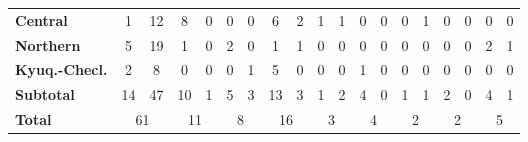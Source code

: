 \begin{table}[H]
{\begin{tabular}{lcccccccccccccccccc}
\multicolumn{1}{l|}{\textbf{Central}} & \multicolumn{1}{c|}{1} & \multicolumn{1}{c|}{12} & \multicolumn{1}{c|}{8} & \multicolumn{1}{c|}{0} & \multicolumn{1}{c|}{0} & \multicolumn{1}{c|}{0} & \multicolumn{1}{c|}{6} & \multicolumn{1}{c|}{2} & \multicolumn{1}{c|}{1} & \multicolumn{1}{c|}{1} & \multicolumn{1}{c|}{0} & \multicolumn{1}{c|}{0} & \multicolumn{1}{c|}{0} & \multicolumn{1}{c|}{1} & \multicolumn{1}{c|}{0} & \multicolumn{1}{c|}{0} & \multicolumn{1}{c|}{0} & \multicolumn{1}{c|}{0} \\ \cline{2-19} 
\multicolumn{1}{l|}{\textbf{Northern}} & \multicolumn{1}{c|}{5} & \multicolumn{1}{c|}{19} & \multicolumn{1}{c|}{1} & \multicolumn{1}{c|}{0} & \multicolumn{1}{c|}{2} & \multicolumn{1}{c|}{0} & \multicolumn{1}{c|}{1} & \multicolumn{1}{c|}{1} & \multicolumn{1}{c|}{0} & \multicolumn{1}{c|}{0} & \multicolumn{1}{c|}{0} & \multicolumn{1}{c|}{0} & \multicolumn{1}{c|}{0} & \multicolumn{1}{c|}{0} & \multicolumn{1}{c|}{0} & \multicolumn{1}{c|}{0} & \multicolumn{1}{c|}{2} & \multicolumn{1}{c|}{1} \\ \cline{2-19} 
\multicolumn{1}{l|}{\textbf{Kyuq.-Checl.}} & \multicolumn{1}{c|}{2} & \multicolumn{1}{c|}{8} & \multicolumn{1}{c|}{0} & \multicolumn{1}{c|}{0} & \multicolumn{1}{c|}{0} & \multicolumn{1}{c|}{1} & \multicolumn{1}{c|}{5} & \multicolumn{1}{c|}{0} & \multicolumn{1}{c|}{0} & \multicolumn{1}{c|}{0} & \multicolumn{1}{c|}{1} & \multicolumn{1}{c|}{0} & \multicolumn{1}{c|}{0} & \multicolumn{1}{c|}{0} & \multicolumn{1}{c|}{0} & \multicolumn{1}{c|}{0} & \multicolumn{1}{c|}{0} & \multicolumn{1}{c|}{0} \\ \cline{2-19} 
\multicolumn{1}{l|}{\textbf{Subtotal}} & \multicolumn{1}{c|}{14} & \multicolumn{1}{c|}{47} & \multicolumn{1}{c|}{10} & \multicolumn{1}{c|}{1} & \multicolumn{1}{c|}{5} & \multicolumn{1}{c|}{3} & \multicolumn{1}{c|}{13} & \multicolumn{1}{c|}{3} & \multicolumn{1}{c|}{1} & \multicolumn{1}{c|}{2} & \multicolumn{1}{c|}{4} & \multicolumn{1}{c|}{0} & \multicolumn{1}{c|}{1} & \multicolumn{1}{c|}{1} & \multicolumn{1}{c|}{2} & \multicolumn{1}{c|}{0} & \multicolumn{1}{c|}{4} & \multicolumn{1}{c|}{1} \\ \cline{2-19} 
\multicolumn{1}{l|}{\textbf{Total}} & \multicolumn{2}{c|}{61} & \multicolumn{2}{c|}{11} & \multicolumn{2}{c|}{8} & \multicolumn{2}{c|}{16} & \multicolumn{2}{c|}{3} & \multicolumn{2}{c|}{4} & \multicolumn{2}{c|}{2} & \multicolumn{2}{c|}{2} & \multicolumn{2}{c|}{5} \\ \cline{2-19} 
\end{tabular}
}
\end{table}

